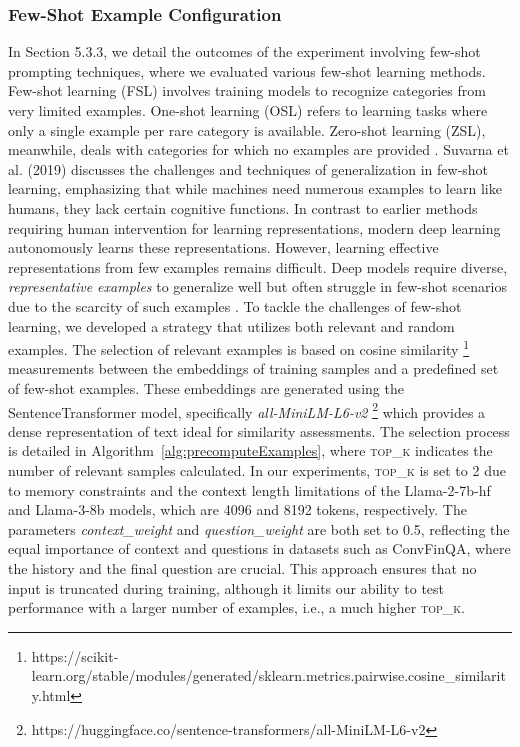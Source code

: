 \documentclass[logo,msc]{infthesis}           %
\begin{document}
\subsubsection*{Few-Shot Example Configuration}
In Section 5.3.3, we detail the outcomes of the experiment involving few-shot prompting techniques, where we evaluated various few-shot learning methods. Few-shot learning (FSL) involves training models to recognize categories from very limited examples. One-shot learning (OSL) refers to learning tasks where only a single example per rare category is available. Zero-shot learning (ZSL), meanwhile, deals with categories for which no examples are provided \cite{billion2024low}. Suvarna et al. (2019) discusses the challenges and techniques of generalization in few-shot learning, emphasizing that while machines need numerous examples to learn like humans, they lack certain cognitive functions. In contrast to earlier methods requiring human intervention for learning representations, modern deep learning autonomously learns these representations. However, learning effective representations from few examples remains difficult. Deep models require diverse, \textit{representative examples} to generalize well but often struggle in few-shot scenarios due to the scarcity of such examples \cite{kadam2020review}.
To tackle the challenges of few-shot learning, we developed a strategy that utilizes both relevant and random examples. The selection of relevant examples is based on cosine similarity \footnote{https://scikit-learn.org/stable/modules/generated/sklearn.metrics.pairwise.cosine\_similarity.html} measurements between the embeddings of training samples and a predefined set of few-shot examples. These embeddings are generated using the SentenceTransformer model, specifically \textit{all-MiniLM-L6-v2} \footnote{https://huggingface.co/sentence-transformers/all-MiniLM-L6-v2} which provides a dense representation of text ideal for similarity assessments. The selection process is detailed in Algorithm~\ref{alg:precomputeExamples}, where \textsc{top\_k} indicates the number of relevant samples calculated. In our experiments, \textsc{top\_k} is set to 2 due to memory constraints and the context length limitations of the Llama-2-7b-hf and Llama-3-8b models, which are 4096 and 8192 tokens, respectively. The parameters \textit{context\_weight} and \textit{question\_weight} are both set to 0.5, reflecting the equal importance of context and questions in datasets such as ConvFinQA, where the history and the final question are crucial. This approach ensures that no input is truncated during training, although it limits our ability to test performance with a larger number of examples, i.e., a much higher \textsc{top\_k}.
\end{document}
